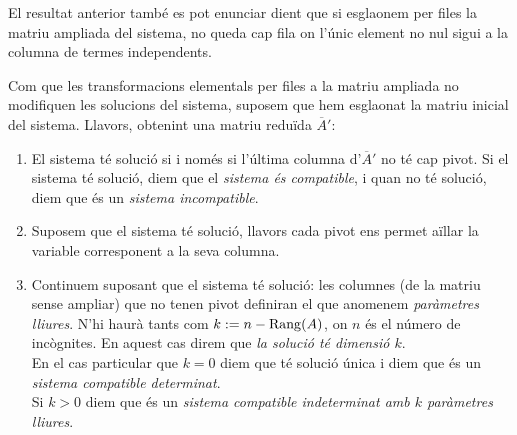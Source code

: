 \documentclass[
  11pt,
]{book}
\numberwithin{dummy}{section}
\theoremstyle{maincolornumbox}
\theoremstyle{blacknumex}
\theoremstyle{blacknumbox}
\theoremstyle{maincolornum}
\newlength\esp
\begin{document}
El resultat anterior també es pot enunciar dient que si esglaonem per
files la matriu ampliada del sistema, no queda cap fila on l'únic
element no nul sigui a la columna de termes independents.

Com que les transformacions elementals per files a la matriu ampliada no
modifiquen les solucions del sistema, suposem que hem esglaonat la
matriu inicial del sistema. Llavors, obtenint una matriu reduïda
\(\overline{A}'\):

\begin{enumerate}
\def\labelenumi{(\alph{enumi})}
\item
  El sistema té solució si i només si l'última columna
  d'\(\overline{A}'\) no té cap pivot. Si el sistema té solució, diem
  que el \emph{sistema és compatible}, i quan no té solució, diem que és un
  \emph{sistema incompatible}.
\item
  Suposem que el sistema té solució, llavors cada pivot ens permet
  aïllar la variable corresponent a la seva columna.
\item
  Continuem suposant que el sistema té solució: les columnes (de la
  matriu sense ampliar) que no tenen pivot definiran el que anomenem
  \emph{paràmetres lliures}. N'hi haurà tants com \(k:=n-\operatorname{Rang}(A)\), on \(n\)
  és el número de incògnites. En aquest cas direm que \emph{la solució té
  dimensió \(k\)}.\\
  En el cas particular que \(k=0\) diem que té solució única i diem que
  és un \emph{sistema compatible determinat}.\\
  Si \(k>0\) diem que és un \emph{sistema compatible indeterminat amb \(k\)
  paràmetres lliures}.
\end{enumerate}
\end{document}
